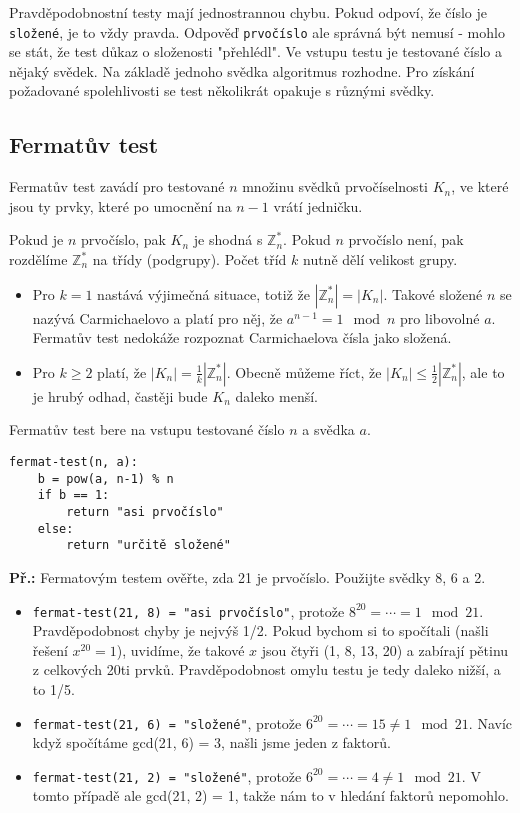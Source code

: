\documentclass[10pt,a4paper]{article}
\begin{document}
Pravděpodobnostní testy mají jednostrannou chybu. Pokud odpoví, že číslo je \texttt{složené}, je to vždy pravda. Odpověď \texttt{prvočíslo} ale správná být nemusí - mohlo se stát, že test důkaz o složenosti "přehlédl". Ve vstupu testu je testované číslo a nějaký svědek. Na základě jednoho svědka algoritmus rozhodne. Pro získání požadované spolehlivosti se test několikrát opakuje s různými svědky.

\subsection{Fermatův test}
Fermatův test zavádí pro testované $n$ množinu svědků prvočíselnosti $K_n$, ve které jsou ty prvky, které po umocnění na $n-1$ vrátí jedničku.

 Pokud je $n$ prvočíslo, pak $K_n$ je shodná s $\mathbb{Z}_n^*$. Pokud $n$ prvočíslo není, pak rozdělíme $\mathbb{Z}_n^*$ na třídy (podgrupy). Počet tříd $k$ nutně dělí velikost grupy.
\begin{itemize}
\item Pro $k = 1$ nastává výjimečná situace, totiž že $|\mathbb{Z}_n^*| = |K_n|$. Takové složené $n$ se nazývá Carmichaelovo a platí pro něj, že $a^{n-1} = 1 \mod n$ pro libovolné $a$. Fermatův test nedokáže rozpoznat Carmichaelova čísla jako složená.
\item Pro $k \geq 2$ platí, že  $|K_n| = \frac{1}{k}|\mathbb{Z}_n^*|$.  Obecně můžeme říct, že $|K_n| \leq \frac{1}{2}|\mathbb{Z}_n^*|$, ale to je hrubý odhad, častěji bude $K_n$ daleko menší.
\end{itemize}

Fermatův test bere na vstupu testované číslo $n$ a svědka $a$.
\begin{verbatim}
fermat-test(n, a):
    b = pow(a, n-1) % n
    if b == 1:
        return "asi prvočíslo"
    else:
        return "určitě složené"
\end{verbatim}

\textbf{Př.:} Fermatovým testem ověřte, zda 21 je prvočíslo. Použijte svědky 8, 6 a 2.
\begin{itemize}
\item \texttt{fermat-test(21, 8) = "asi prvočíslo"}, protože $8^{20} = \cdots = 1 \mod 21$.  Pravděpodobnost chyby je nejvýš 1/2. Pokud bychom si to spočítali (našli řešení $x^{20} = 1$), uvidíme, že takové $x$ jsou čtyři (1, 8, 13, 20) a zabírají pětinu z celkových 20ti prvků. Pravděpodobnost omylu testu je tedy daleko nižší, a to 1/5.
\item \texttt{fermat-test(21, 6) = "složené"}, protože $6^{20} = \cdots = 15 \neq 1 \mod 21$. Navíc když spočítáme gcd(21, 6) = 3, našli jsme jeden z faktorů.
\item \texttt{fermat-test(21, 2) = "složené"}, protože $6^{20} = \cdots = 4\neq 1 \mod 21$. V tomto případě ale gcd(21, 2) = 1, takže nám to v hledání faktorů nepomohlo.
\end{itemize}
\end{document}
